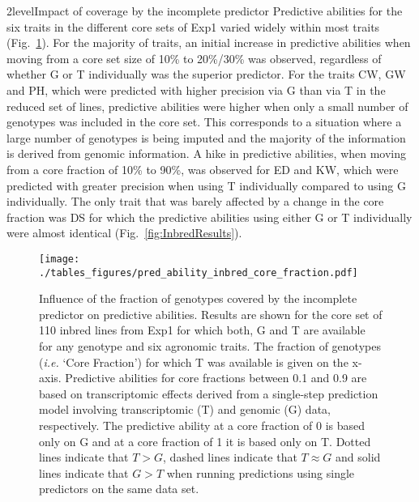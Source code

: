\documentclass[12pt,titlepage]{article}
\begin{document}
\Genetics2level{Impact of coverage by the incomplete predictor}
Predictive abilities for the six traits in the different core sets of Exp1
varied widely within most traits (Fig.~\ref{fig:core-results}).
For the majority of traits, an initial increase in predictive abilities when
moving from a core set size of 10\% to 20\%/30\% was observed, regardless of
whether G or T individually was the superior predictor.
For the traits CW, GW and PH, which were predicted with higher precision via G
than via T in the reduced set of lines, predictive abilities were higher when
only a small number of genotypes was included in the core set.
This corresponds to a situation where a large number of genotypes is being 
imputed and the majority of the information is derived from genomic information.
A hike in predictive abilities, when moving from a core fraction of 10\% to 
90\%, was observed for ED and KW, which were predicted with greater precision
when using T individually compared to using G individually.
The only trait that was barely affected by a change in the core fraction was DS
for which the predictive abilities using either G or T individually were almost
identical (Fig.~\ref{fig:InbredResults}).

\begin{figure}[H]
  \centering
  \texttt{[image: ./tables\_figures/pred\_ability\_inbred\_core\_fraction.pdf]}
  \caption{
  Influence of the fraction of genotypes covered by the incomplete predictor
  on predictive abilities.
  Results are shown for the core set of 110 inbred lines from Exp1 for
  which both, G and T are available for any genotype and six agronomic traits.
  The fraction of genotypes (\textit{i.e.} `Core Fraction') for which
  T was available is given on the x-axis.
  Predictive abilities for core fractions between 0.1 and 0.9 are based on
  transcriptomic effects derived from a single-step prediction model involving
  transcriptomic (T) and genomic (G) data, respectively.
  The predictive ability at a core fraction of 0 is based only on G and at a
  core fraction of 1 it is based only on T.
  Dotted lines indicate that $T > G$, dashed lines indicate that $T \approx G$
  and solid lines indicate that $G > T$ when running predictions using single
  predictors on the same data set.
  }
\label{fig:core-results}
\end{figure}
\end{document}
